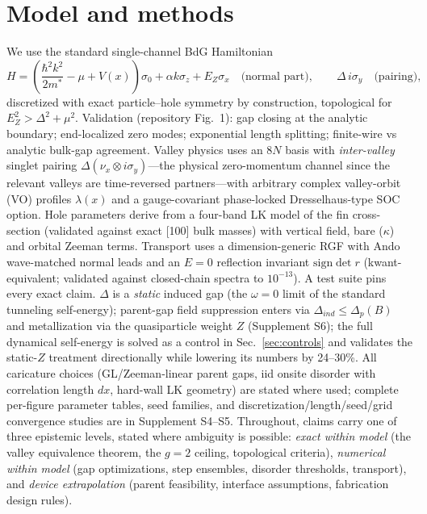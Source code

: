 \documentclass[11pt]{article}
\begin{document}
\section{Model and methods}
We use the standard single-channel BdG Hamiltonian
\begin{equation}
H = \left(\frac{\hbar^2 k^2}{2m^*} - \mu + V(x)\right)\sigma_0
+ \alpha k \sigma_z + E_Z \sigma_x \quad\text{(normal part)},\qquad
\Delta\, i\sigma_y \quad\text{(pairing)},
\end{equation}
discretized with exact particle--hole symmetry by construction, topological for
$E_Z^2 > \Delta^2 + \mu^2$. Validation (repository Fig.~1): gap closing at the analytic
boundary; end-localized zero modes; exponential length splitting; finite-wire vs
analytic bulk-gap agreement. Valley physics uses an $8N$ basis with \emph{inter-valley}
singlet pairing $\Delta(\nu_x \otimes i\sigma_y)$---the physical zero-momentum channel
since the relevant valleys are time-reversed partners---with arbitrary complex
valley-orbit (VO) profiles $\lambda(x)$ and a gauge-covariant phase-locked
Dresselhaus-type SOC option. Hole parameters derive from a four-band LK model of the
fin cross-section (validated against exact [100] bulk masses) with vertical field,
bare ($\kappa$) and orbital Zeeman terms. Transport uses a dimension-generic RGF with
Ando wave-matched normal leads and an $E=0$ reflection invariant $\mathrm{sign}\det r$
(kwant-equivalent; validated against closed-chain spectra to $10^{-13}$). A test suite
pins every exact claim. $\Delta$ is a \emph{static} induced gap (the
$\omega = 0$ limit of the standard tunneling self-energy); parent-gap field
suppression enters via $\Delta_{ind} \le \Delta_p(B)$ and metallization via the
quasiparticle weight $Z$ \cite{cole2015,maier,reeg} (Supplement S6); the full
dynamical self-energy is solved as a control in Sec.~\ref{sec:controls} and
validates the static-$Z$ treatment directionally while lowering its numbers
by 24--30\%. All caricature choices (GL/Zeeman-linear parent gaps, iid
onsite disorder with correlation length $dx$, hard-wall LK geometry) are stated
where used; complete per-figure parameter tables, seed families, and
discretization/length/seed/grid convergence studies are in Supplement S4--S5.
Throughout, claims carry one of three epistemic levels, stated where
ambiguity is possible: \emph{exact within model} (the valley equivalence
theorem, the $g = 2$ ceiling, topological criteria), \emph{numerical within
model} (gap optimizations, step ensembles, disorder thresholds, transport),
and \emph{device extrapolation} (parent feasibility, interface assumptions,
fabrication design rules).
\end{document}
